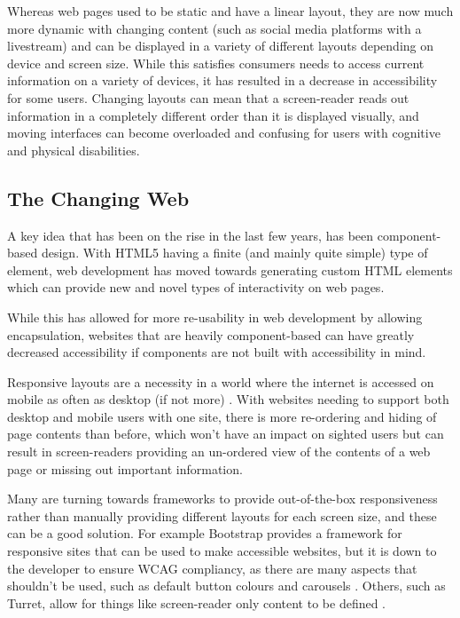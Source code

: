 \documentclass[ %
                    author={Aleena Baig},
                supervisor={Dr Simon Lock},
                    degree={BSc},
                     title={On Making Web Accessible Graphs},
                  subtitle={},
                      year={2019} ]{dissertation}
\begin{document}
Whereas web pages used to be static and have a linear layout, they are now much more dynamic with changing content (such as social media platforms with a livestream) and can be displayed in a variety of different layouts depending on device and screen size. While this satisfies consumers needs to access current information on a variety of devices, it has resulted in a decrease in accessibility for some users. Changing layouts can mean that a screen-reader reads out information in a completely different order than it is displayed visually, and moving interfaces can become overloaded and confusing for users with cognitive and physical disabilities.

\subsection{The Changing Web}

A key idea that has been on the rise in the last few years, has been component-based design. With HTML5 having a finite (and mainly quite simple) type of element, web development has moved towards generating custom HTML elements which can provide new and novel types of interactivity on web pages.

While this has allowed for more re-usability in web development by allowing encapsulation, websites that are heavily component-based can have greatly decreased accessibility if components are not built with accessibility in mind.

Responsive layouts are a necessity in a world where the internet is accessed on mobile as often as desktop (if not more) \cite{mobileusestudy}. With websites needing to support both desktop and mobile users with one site, there is more re-ordering and hiding of page contents than before, which won't have an impact on sighted users but can result in screen-readers providing an un-ordered view of the contents of a web page or missing out important information.

Many are turning towards frameworks to provide out-of-the-box responsiveness rather than manually providing different layouts for each screen size, and these can be a good solution. For example Bootstrap provides a framework for responsive sites that can be used to make accessible websites, but it is down to the developer to ensure WCAG compliancy, as there are many aspects that shouldn't be used, such as default button colours and carousels \cite{bootstrapaccessibility}. Others, such as Turret, allow for things like screen-reader only content to be defined \cite{turretaccessibility}.
\end{document}
